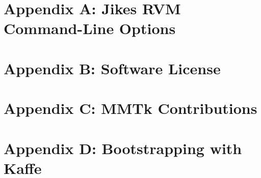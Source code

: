 \documentclass{article}
\begin{document}
\section{Appendix A: Jikes RVM Command-Line Options}
\label{appendix:nonadaptive:cmdline}


\T \newpage
{}
\section{Appendix B: Software License}
\label{appendix:licenses}


\T \newpage
{}
\section{Appendix C: MMTk Contributions}
\label{appendix:contributions}


\T \newpage
{}
\section{Appendix D: Bootstrapping with Kaffe}
\label{appendix:kaffe}


\W \section*{\indexname}\label{hlxindex}
\W \htmlprintindex
\T \printindex

 \W {}
 \W 
\end{document}
